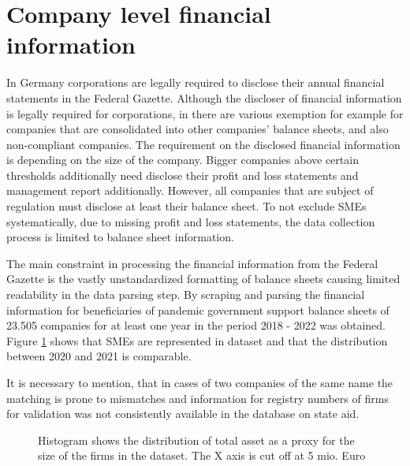 \section{Company level financial information}

In Germany corporations are legally required to disclose their annual financial statements in the Federal Gazette. Although the discloser of financial information is legally required for corporations, in there are various exemption for example for companies that are consolidated into other companies' balance sheets, and also non-compliant companies.
The requirement on the disclosed financial information is depending on the size of the company. Bigger companies above certain thresholds additionally need disclose their profit and loss statements and management report additionally. However, all companies that are subject of regulation must disclose at least their balance sheet. 
To not exclude SMEs systematically, due to missing profit and loss statements, the data collection process is limited to balance sheet information. 

The main constraint in processing the financial information from the Federal Gazette is the vastly unstandardized formatting of balance sheets causing limited readability in the data parsing step. By scraping and parsing the financial information for beneficiaries of pandemic government support balance sheets of 23.505 companies for at least one year in the period 2018 - 2022 was obtained. Figure \ref{fig:FirmSizes} shows that SMEs are represented in dataset and that the distribution between 2020 and 2021 is comparable.

It is necessary to mention, that in cases of two companies of the same name the matching is prone to mismatches and information for registry numbers of firms for validation was not consistently available in the database on state aid.

\begin{figure}
    \centering
    
    \decoRule
    \caption[Firm size distribution in dataset]{Histogram shows the distribution of total asset as a proxy for the size of the firms in the dataset. The X axis is cut off at 5 mio. Euro}
    \label{fig:FirmSizes}
\end{figure}


